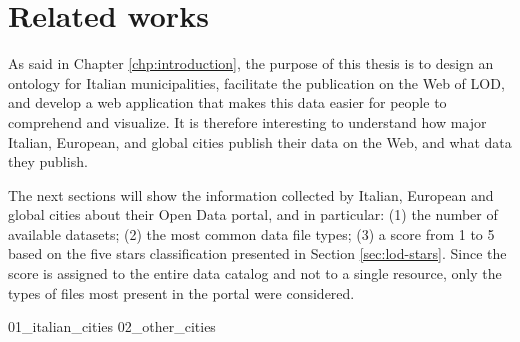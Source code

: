 \chapter{Related works}
\label{chp:related}

As said in Chapter \ref{chp:introduction}, the purpose of this thesis is to design an ontology for Italian municipalities, facilitate the publication on the Web of \acl{LOD}, and develop a web application that makes this data easier for people to comprehend and visualize. It is therefore interesting to understand how major Italian, European, and global cities publish their data on the Web, and what data they publish. 

The next sections will show the information collected by Italian, European and global cities about their Open Data portal, and in particular: (1) the number of available datasets; (2) the most common data file types; (3) a score from 1 to 5 based on the five stars classification presented in Section \ref{sec:lod-stars}. Since the score is assigned to the entire data catalog and not to a single resource, only the types of files most present in the portal were considered.

{01_italian_cities}%
{02_other_cities}%




